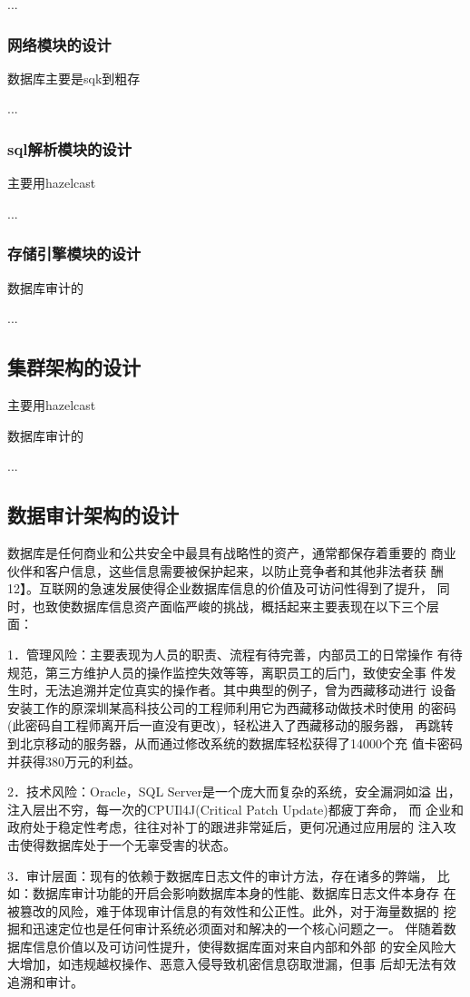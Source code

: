 ...
\subsubsection*{网络模块的设计}
数据库主要是sqk到粗存

...
\subsubsection*{sql解析模块的设计}
主要用hazelcast

...
\subsubsection*{存储引擎模块的设计}
数据库审计的

...
\subsection{集群架构的设计}
主要用hazelcast


数据库审计的

...
\subsection{数据审计架构的设计}
数据库是任何商业和公共安全中最具有战略性的资产，通常都保存着重要的
商业伙伴和客户信息，这些信息需要被保护起来，以防止竞争者和其他非法者获
酬12】。互联网的急速发展使得企业数据库信息的价值及可访问性得到了提升，
同时，也致使数据库信息资产面临严峻的挑战，概括起来主要表现在以下三个层
面：

1．管理风险：主要表现为人员的职责、流程有待完善，内部员工的日常操作
有待规范，第三方维护人员的操作监控失效等等，离职员工的后门，致使安全事
件发生时，无法追溯并定位真实的操作者。其中典型的例子，曾为西藏移动进行
设备安装工作的原深圳某高科技公司的工程师利用它为西藏移动做技术时使用
的密码(此密码自工程师离开后一直没有更改)，轻松进入了西藏移动的服务器，
再跳转到北京移动的服务器，从而通过修改系统的数据库轻松获得了14000个充
值卡密码并获得380万元的利益。

2．技术风险：Oracle，SQL Server是一个庞大而复杂的系统，安全漏洞如溢
出， 注入层出不穷，每一次的CPUIl4J(Critical Patch Update)都疲丁奔命，
 而
企业和政府处于稳定性考虑，往往对补丁的跟进非常延后，更何况通过应用层的
注入攻击使得数据库处于一个无辜受害的状态。

3．审计层面：现有的依赖于数据库日志文件的审计方法，存在诸多的弊端，
比如：数据库审计功能的开启会影响数据库本身的性能、数据库日志文件本身存
在被篡改的风险，难于体现审计信息的有效性和公正性。此外，对于海量数据的
挖掘和迅速定位也是任何审计系统必须面对和解决的一个核心问题之一。
伴随着数据库信息价值以及可访问性提升，使得数据库面对来自内部和外部
的安全风险大大增加，如违规越权操作、恶意入侵导致机密信息窃取泄漏，但事
后却无法有效追溯和审计。

